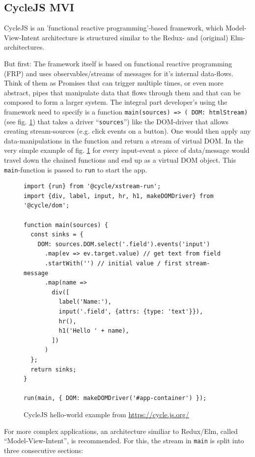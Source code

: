\subsection{CycleJS MVI}

CycleJS is an 'functional reactive programming'-based framework, which Model-View-Intent architecture is structured similar to the Redux- and (original) Elm-architectures. 

But first: The framework itself is based on functional reactive programming (FRP) and uses observables/streams of messages for it's internal data-flows. Think of them as Promises that can trigger multiple times, or even more abstract, pipes that manipulate data that flows through them and that can be composed to form a larger system. The integral part developer's using the framework need to specify is a function \texttt{main(sources) => ({ DOM: htmlStream})} (see fig. \ref{fig:cyclejs}) that takes a driver ``\texttt{sources}'') like the DOM-driver that allows creating stream-sources (e.g. click events on a button). One would then apply any data-manipulations in the function and return a stream of virtual DOM. In the very simple example of fig. \ref{fig:cyclejs} for every input-event a piece of data/message would travel down the chained functions and end up as a virtual DOM object. This \texttt{main}-function is passed to \texttt{run} to start the app.

\begin{figure}
\centering
\begin{verbatim}
import {run} from '@cycle/xstream-run';
import {div, label, input, hr, h1, makeDOMDriver} from '@cycle/dom';

function main(sources) {
  const sinks = {
    DOM: sources.DOM.select('.field').events('input')
      .map(ev => ev.target.value) // get text from field
      .startWith('') // initial value / first stream-message
      .map(name =>
        div([
          label('Name:'),
          input('.field', {attrs: {type: 'text'}}),
          hr(),
          h1('Hello ' + name),
        ])
      )
  };
  return sinks;
}

run(main, { DOM: makeDOMDriver('#app-container') });
\end{verbatim}
\caption{CycleJS hello-world example from \url{https://cycle.js.org/}}
\label{fig:cyclejs}
\end{figure}

For more complex applications, an architecture similiar to Redux/Elm, called ``Model-View-Intent'', is recommended. For this, the stream in \texttt{main} is split into three consecutive sections: 

